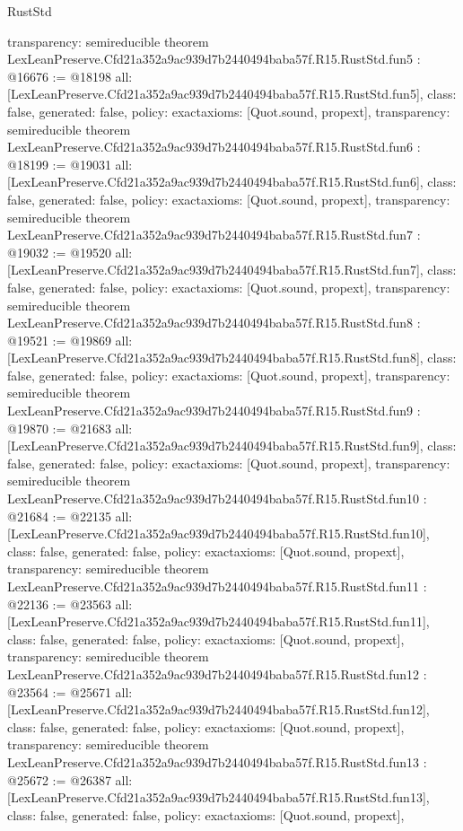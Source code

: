 \begin{lexlean}{RustStd}
\begin{coremodule}
{  transparency: semireducible
}
theorem LexLeanPreserve.Cfd21a352a9ac939d7b2440494baba57f.R15.RustStd.fun5 : @16676 := @18198 {
  all: [LexLeanPreserve.Cfd21a352a9ac939d7b2440494baba57f.R15.RustStd.fun5],
  class: false,
  generated: false,
  policy: exact{axioms: [Quot.sound, propext]},
  transparency: semireducible
}
theorem LexLeanPreserve.Cfd21a352a9ac939d7b2440494baba57f.R15.RustStd.fun6 : @18199 := @19031 {
  all: [LexLeanPreserve.Cfd21a352a9ac939d7b2440494baba57f.R15.RustStd.fun6],
  class: false,
  generated: false,
  policy: exact{axioms: [Quot.sound, propext]},
  transparency: semireducible
}
theorem LexLeanPreserve.Cfd21a352a9ac939d7b2440494baba57f.R15.RustStd.fun7 : @19032 := @19520 {
  all: [LexLeanPreserve.Cfd21a352a9ac939d7b2440494baba57f.R15.RustStd.fun7],
  class: false,
  generated: false,
  policy: exact{axioms: [Quot.sound, propext]},
  transparency: semireducible
}
theorem LexLeanPreserve.Cfd21a352a9ac939d7b2440494baba57f.R15.RustStd.fun8 : @19521 := @19869 {
  all: [LexLeanPreserve.Cfd21a352a9ac939d7b2440494baba57f.R15.RustStd.fun8],
  class: false,
  generated: false,
  policy: exact{axioms: [Quot.sound, propext]},
  transparency: semireducible
}
theorem LexLeanPreserve.Cfd21a352a9ac939d7b2440494baba57f.R15.RustStd.fun9 : @19870 := @21683 {
  all: [LexLeanPreserve.Cfd21a352a9ac939d7b2440494baba57f.R15.RustStd.fun9],
  class: false,
  generated: false,
  policy: exact{axioms: [Quot.sound, propext]},
  transparency: semireducible
}
theorem LexLeanPreserve.Cfd21a352a9ac939d7b2440494baba57f.R15.RustStd.fun10 : @21684 := @22135 {
  all: [LexLeanPreserve.Cfd21a352a9ac939d7b2440494baba57f.R15.RustStd.fun10],
  class: false,
  generated: false,
  policy: exact{axioms: [Quot.sound, propext]},
  transparency: semireducible
}
theorem LexLeanPreserve.Cfd21a352a9ac939d7b2440494baba57f.R15.RustStd.fun11 : @22136 := @23563 {
  all: [LexLeanPreserve.Cfd21a352a9ac939d7b2440494baba57f.R15.RustStd.fun11],
  class: false,
  generated: false,
  policy: exact{axioms: [Quot.sound, propext]},
  transparency: semireducible
}
theorem LexLeanPreserve.Cfd21a352a9ac939d7b2440494baba57f.R15.RustStd.fun12 : @23564 := @25671 {
  all: [LexLeanPreserve.Cfd21a352a9ac939d7b2440494baba57f.R15.RustStd.fun12],
  class: false,
  generated: false,
  policy: exact{axioms: [Quot.sound, propext]},
  transparency: semireducible
}
theorem LexLeanPreserve.Cfd21a352a9ac939d7b2440494baba57f.R15.RustStd.fun13 : @25672 := @26387 {
  all: [LexLeanPreserve.Cfd21a352a9ac939d7b2440494baba57f.R15.RustStd.fun13],
  class: false,
  generated: false,
  policy: exact{axioms: [Quot.sound, propext]},
}
\end{coremodule}
\end{lexlean}
